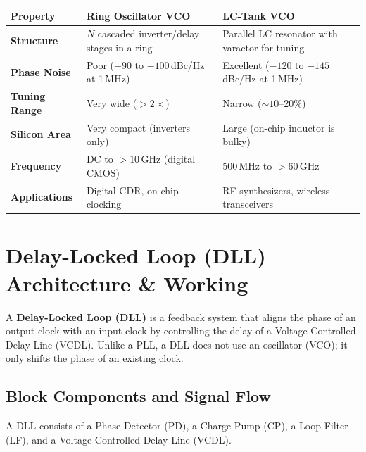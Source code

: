 \documentclass[12pt,a4paper]{article}
\renewcommand{\arraystretch}{1.45}
\begin{document}
\begin{tcolorbox}[tikzbox, title={Ring Oscillator vs.~LC-Tank VCO Comparison}]
\centering
\par\noindent
\renewcommand{\arraystretch}{1.3}
\begin{tabularx}{\linewidth}{|B{3.0cm}|Y|Y|}
\hline
\textbf{Property} & \textbf{Ring Oscillator VCO} & \textbf{LC-Tank VCO} \\ \hline
\textbf{Structure} & $N$ cascaded inverter/delay stages in a ring & Parallel LC resonator with varactor for tuning \\ \hline
\textbf{Phase Noise} & Poor ($-90$ to $-100\,$dBc/Hz at 1\,MHz) & Excellent ($-120$ to $-145\,$dBc/Hz at 1\,MHz) \\ \hline
\textbf{Tuning Range} & Very wide ($>2\times$) & Narrow ($\sim 10$--$20\%$) \\ \hline
\textbf{Silicon Area} & Very compact (inverters only) & Large (on-chip inductor is bulky) \\ \hline
\textbf{Frequency} & DC to $>10\,$GHz (digital CMOS) & $500\,$MHz to $>60\,$GHz \\ \hline
\textbf{Applications} & Digital CDR, on-chip clocking & RF synthesizers, wireless transceivers \\ \hline
\end{tabularx}
\end{tcolorbox}

\section{Delay-Locked Loop (DLL) Architecture \& Working}

\begin{tcolorbox}[defbox, title={\textbf{Delay-Locked Loop (DLL) Concept}}]
A \textbf{Delay-Locked Loop (DLL)} is a feedback system that aligns the phase of an output clock with an input clock by controlling the delay of a Voltage-Controlled Delay Line (VCDL). Unlike a PLL, a DLL does not use an oscillator (VCO); it only shifts the phase of an existing clock.
\end{tcolorbox}

\subsection{Block Components and Signal Flow}
A DLL consists of a Phase Detector (PD), a Charge Pump (CP), a Loop Filter (LF), and a Voltage-Controlled Delay Line (VCDL).
\end{document}
